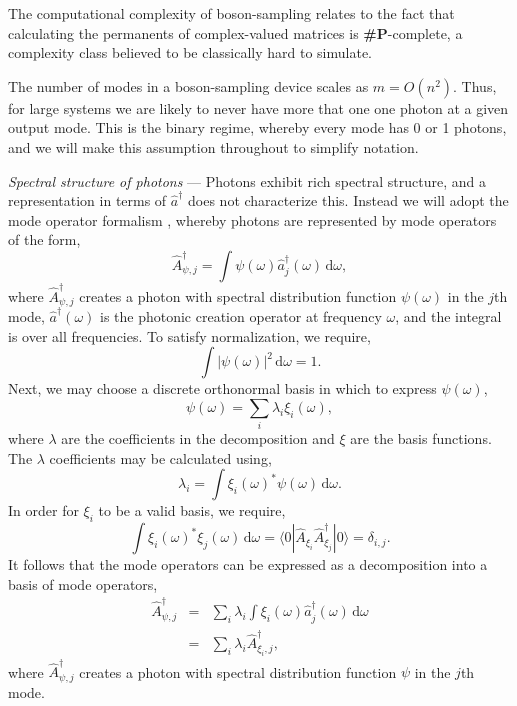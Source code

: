 \documentclass[aps,prl,twocolumn,amsmath,amssymb,nofootinbib,superscriptaddress]{revtex4}
\newcommand{\bra}[1]{\langle#1|}
\newcommand{\ket}[1]{|#1\rangle}
\begin{document}
The computational complexity of boson-sampling relates to the fact that calculating the permanents of complex-valued matrices is \textbf{\#P}-complete, a complexity class believed to be classically hard to simulate.

The number of modes in a boson-sampling device scales as \mbox{$m=O(n^2)$}. Thus, for large systems we are likely to never have more that one one photon at a given output mode. This is the binary regime, whereby every mode has 0 or 1 photons, and we will make this assumption throughout to simplify notation.

%
%

\emph{Spectral structure of photons} --- Photons exhibit rich spectral structure, and a representation in terms of \mbox{$\hat{a}^\dag$} does not characterize this. Instead we will adopt the mode operator formalism \cite{bib:RohdeMauererSilberhorn07}, whereby photons are represented by mode operators of the form,
\begin{equation}
\hat{A}_{\psi,j}^\dag = \int \psi(\omega) \hat{a}_j^\dag(\omega)\, \mathrm{d}\omega,
\end{equation}
where \mbox{$\hat{A}_{\psi,j}^\dag$} creates a photon with spectral distribution function \mbox{$\psi(\omega)$} in the $j$th mode, \mbox{$\hat{a}^\dag(\omega)$} is the photonic creation operator at frequency $\omega$, and the integral is over all frequencies. To satisfy normalization, we require,
\begin{equation}
\int |\psi(\omega)|^2 \,\mathrm{d}\omega = 1.
\end{equation}
Next, we may choose a discrete orthonormal basis in which to express \mbox{$\psi(\omega)$},
\begin{equation}
\psi(\omega) = \sum_i \lambda_i \xi_i(\omega),
\end{equation}
where $\lambda$ are the coefficients in the decomposition and $\xi$ are the basis functions. The $\lambda$ coefficients may be calculated using,
\begin{equation}
\lambda_i = \int \xi_i(\omega)^* \psi(\omega)\, \mathrm{d}\omega.
\end{equation}
In order for $\xi_i$ to be a valid basis, we require,
\begin{equation} \label{eq:orthonormality}
\int \xi_i(\omega)^*\xi_j(\omega)\,\mathrm{d}\omega = \bra{0} \hat{A}_{\xi_i} \hat{A}_{\xi_j}^\dag \ket{0} = \delta_{i,j}.
\end{equation}
It follows that the mode operators can be expressed as a decomposition into a basis of mode operators,
\begin{eqnarray}
\hat{A}_{\psi,j}^\dag &=& \sum_i \lambda_i \int \xi_i(\omega) \hat{a}_j^\dag(\omega)\, \mathrm{d}\omega \nonumber \\
&=& \sum_i \lambda_i \hat{A}_{\xi_i,j}^\dag,
\end{eqnarray}
where \mbox{$\hat{A}_{\psi,j}^\dag$} creates a photon with spectral distribution function $\psi$ in the $j$th mode.
\end{document}
